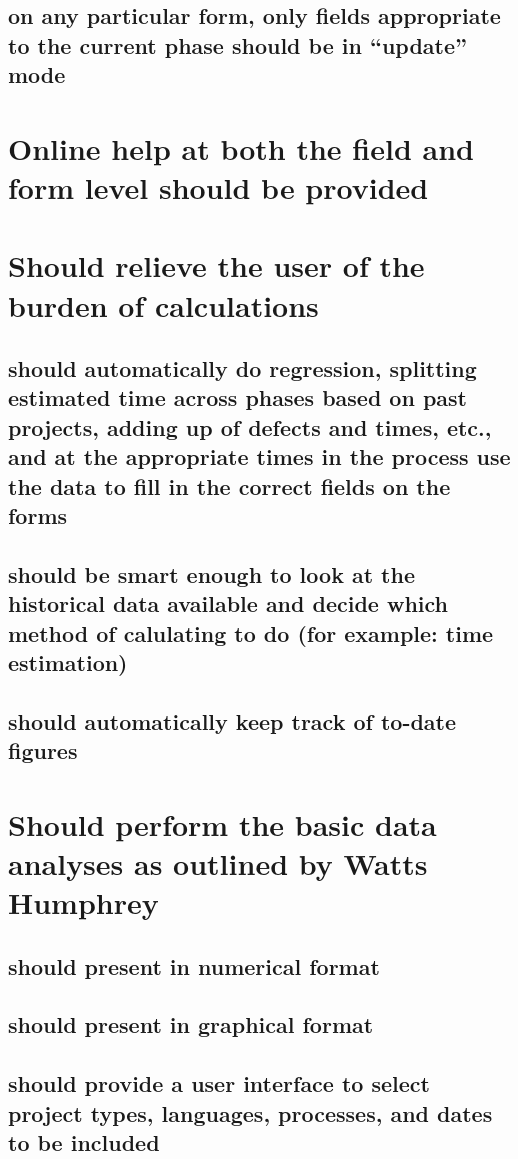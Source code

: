 \subsection{on any particular form, only fields appropriate to the current
phase should be in ``update'' mode}
\section{Online help at both the field and form level should be provided}
\section{Should relieve the user of the burden of calculations}
\subsection{should automatically do regression, splitting estimated time
across phases based on past projects, adding up of defects and times, etc.,
and at the appropriate times in the process use the data to fill in the
correct fields on the forms}
\subsection{should be smart enough to look at the historical data available and decide
which method of calulating to do (for example: time estimation)}
\subsection{should automatically keep track of to-date figures}
\section{Should perform the basic data analyses as outlined by Watts
Humphrey}
\subsection{should present in numerical format}
\subsection{should present in graphical format}
\subsection{should provide a user interface to select project types,
languages, processes, and dates to be included}
